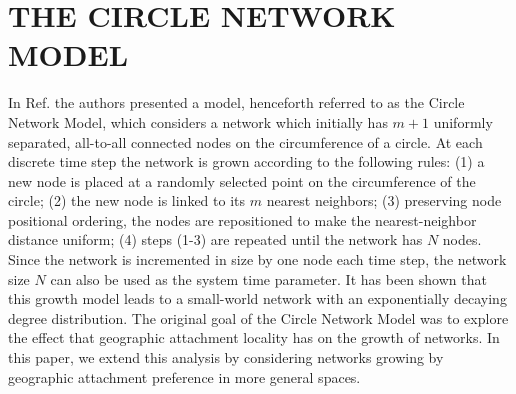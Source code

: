 \documentclass[aps,pre,manuscript,superscriptaddress,amsmath,amssymb,nofootinbib]{revtex4-1}
\begin{document}
\section{THE CIRCLE NETWORK MODEL}
In Ref. \cite{ozik2004} the authors presented a model, henceforth referred to as the Circle Network Model, which considers a network which initially has $m+1$ uniformly separated, all-to-all connected nodes on the circumference of a circle. 
At each discrete time step the network is grown according to the following rules: 
(1) a new node is placed at a randomly selected point on the circumference of the circle;
(2) the new node is linked to its $m$ nearest neighbors;
(3) preserving node positional ordering, the nodes are repositioned to make the nearest-neighbor distance uniform;
(4) steps (1-3) are repeated until the network has $N$ nodes.
Since the network is incremented in size by one node each time step, the network size $N$ can also be used as the system time parameter.  
It has been shown \cite{ozik2004} that this growth model leads to a small-world network with an exponentially decaying degree distribution. 
The original goal of the Circle Network Model was to explore the effect that geographic attachment locality has on the growth of networks.
In this paper, we extend this analysis by considering networks growing by geographic attachment preference in more general spaces. 
\end{document}
